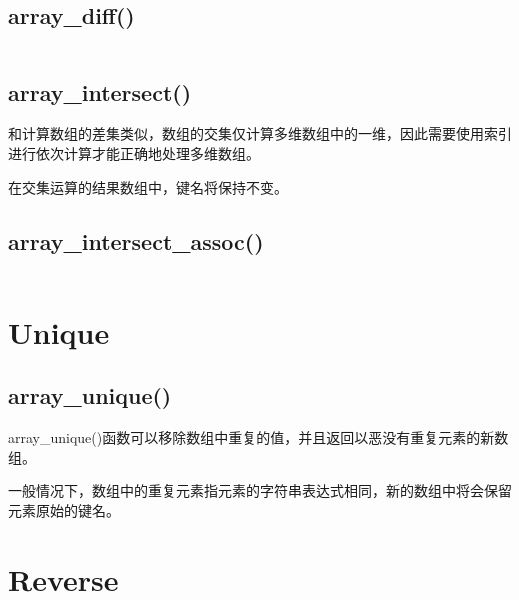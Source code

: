 \begin{lstlisting}[language=PHP]

\end{lstlisting}


\subsection{array\_diff()}


\begin{lstlisting}[language=PHP]

\end{lstlisting}

\subsection{array\_intersect()}

和计算数组的差集类似，数组的交集仅计算多维数组中的一维，因此需要使用索引进行依次计算才能正确地处理多维数组。

在交集运算的结果数组中，键名将保持不变。




\subsection{array\_intersect\_assoc()}



\begin{lstlisting}[language=PHP]

\end{lstlisting}


\section{Unique}

\subsection{array\_unique()}

array\_unique()函数可以移除数组中重复的值，并且返回以恶没有重复元素的新数组。

一般情况下，数组中的重复元素指元素的字符串表达式相同，新的数组中将会保留元素原始的键名。




\section{Reverse}


